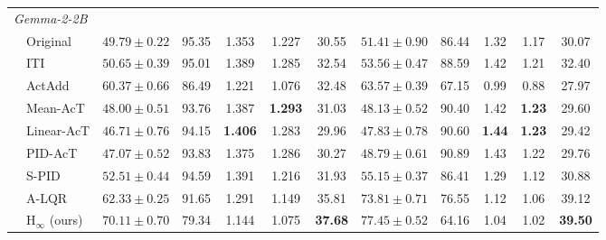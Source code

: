 \begin{table}[!htbp]
{\begin{tabular}{llccccc|ccccc}
\multicolumn{12}{l}{\textit{Gemma-2-2B}} \\
& Original
& $49.79\!\pm\!0.22$ & 95.35 & 1.353 & 1.227 & 30.55
& $51.41\!\pm\!0.90$ & 86.44 & 1.32 & 1.17 & 30.07 \\
& ITI
& $50.65\!\pm\!0.39$ & 95.01 & 1.389 & 1.285 & 32.54
& $53.56\!\pm\!0.47$ & 88.59 & 1.42 & 1.21 & 32.40 \\
& ActAdd
& $60.37\!\pm\!0.66$ & 86.49 & 1.221 & 1.076 & 32.48
& $63.57\!\pm\!0.39$ & 67.15 & 0.99 & 0.88 & 27.97 \\
& Mean-AcT
& $48.00\!\pm\!0.51$ & 93.76 & 1.387 & \textbf{1.293} & 31.03
& $48.13\!\pm\!0.52$ & 90.40 & 1.42 & \textbf{1.23} & 29.60 \\
& Linear-AcT
& $46.71\!\pm\!0.76$ & 94.15 & \textbf{1.406} & 1.283 & 29.96
& $47.83\!\pm\!0.78$ & 90.60 & \textbf{1.44} & \textbf{1.23} & 29.42 \\
& PID-AcT
& $47.07\!\pm\!0.52$ & 93.83 & 1.375 & 1.286 & 30.27
& $48.79\!\pm\!0.61$ & 90.89 & 1.43 & 1.22 & 29.76 \\
& S-PID
& $52.51\!\pm\!0.44$ & 94.59 & 1.391 & 1.216 & 31.93
& $55.15\!\pm\!0.37$ & 86.41 & 1.29 & 1.12 & 30.88 \\
& A-LQR
& $62.33\!\pm\!0.25$ & 91.65 & 1.291 & 1.149 & 35.81
& $73.81\!\pm\!0.71$ & 76.55 & 1.12 & 1.06 & 39.12 \\
& $\mathrm{H}_{\infty}$ (ours)
& $\mathbf{70.11\!\pm\!0.70}$ & 79.34 & 1.144 & 1.075 & \textbf{37.68}
& $\mathbf{77.45\!\pm\!0.52}$ & 64.16 & 1.04 & 1.02 & \textbf{39.50} \\


\end{tabular}}
\end{table}
